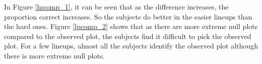 \documentclass[12]{article}
\begin{document}
In Figure \ref{lpcomp_1}, it can be seen that as the difference increases, the proportion correct increases. So the subjects do better in the easier lineups than the hard ones. Figure \ref{lpcomp_2} shows that as there are more extreme null plots compared to the observed plot, the subjects find it difficult to pick the observed plot. For a few lineups, almost all the subjects identify the observed plot although there is more extreme null plots. 

\begin{figure}[hbtp]
\centering
{}
\end{figure}
\end{document}
